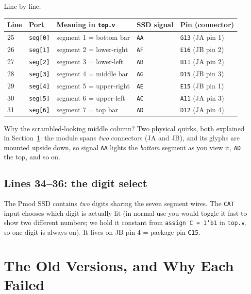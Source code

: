 \documentclass[11pt]{article}
\begin{document}
Line by line:
\begin{center}
\begin{tabular}{@{}lllll@{}}
\toprule
Line & Port & Meaning in \texttt{top.v} & SSD signal & Pin (connector) \\
\midrule
25 & \texttt{seg[0]} & segment 1 = bottom bar    & \texttt{AA} & \texttt{G13} (JA pin 1) \\
26 & \texttt{seg[1]} & segment 2 = lower-right   & \texttt{AF} & \texttt{E16} (JB pin 2) \\
27 & \texttt{seg[2]} & segment 3 = lower-left    & \texttt{AB} & \texttt{B11} (JA pin 2) \\
28 & \texttt{seg[3]} & segment 4 = middle bar    & \texttt{AG} & \texttt{D15} (JB pin 3) \\
29 & \texttt{seg[4]} & segment 5 = upper-right   & \texttt{AE} & \texttt{E15} (JB pin 1) \\
30 & \texttt{seg[5]} & segment 6 = upper-left    & \texttt{AC} & \texttt{A11} (JA pin 3) \\
31 & \texttt{seg[6]} & segment 7 = top bar       & \texttt{AD} & \texttt{D12} (JA pin 4) \\
\bottomrule
\end{tabular}
\end{center}

Why the scrambled-looking middle column? Two physical quirks, both
explained in Section~\ref{sec:whyoldfailed}: the module spans \emph{two}
connectors (JA and JB), and its glyphs are mounted upside down, so signal
\texttt{AA} lights the \emph{bottom} segment as you view it, \texttt{AD}
the top, and so on.

\subsection{Lines 34--36: the digit select}
The Pmod SSD contains \emph{two} digits sharing the seven segment wires.
The \texttt{CAT} input chooses which digit is actually lit (in normal use
you would toggle it fast to show two different numbers; we hold it
constant from \texttt{assign C = 1'b1} in \texttt{top.v}, so one digit is
always on). It lives on JB pin 4 = package pin \texttt{C15}.

\section{The Old Versions, and Why Each Failed}
\label{sec:whyoldfailed}
\end{document}
